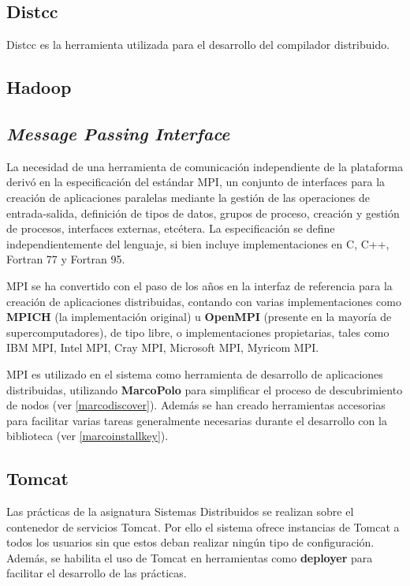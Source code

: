 \subsection{Distcc}

Distcc es la herramienta utilizada para el desarrollo del compilador distribuido. %

\subsection{Hadoop}

\subsection{\textit{Message Passing Interface}}

La necesidad de una herramienta de comunicación independiente de la plataforma derivó en la especificación del estándar MPI\cite{MPISpec}, un conjunto de interfaces para la creación de aplicaciones paralelas mediante la gestión de las operaciones de entrada-salida, definición de tipos de datos, grupos de proceso, creación y gestión de procesos, interfaces externas, etcétera. La especificación se define independientemente del lenguaje, si bien incluye implementaciones en C, C++, Fortran 77 y Fortran 95.

MPI se ha convertido con el paso de los años en la interfaz de referencia para la creación de aplicaciones distribuidas, contando con varias implementaciones como \textbf{MPICH} (la implementación original) u \textbf{OpenMPI} (presente en la mayoría de supercomputadores), de tipo libre, o implementaciones propietarias, tales como IBM MPI, Intel MPI, Cray MPI, Microsoft MPI, Myricom MPI.

MPI es utilizado en el sistema como herramienta de desarrollo de aplicaciones distribuidas, utilizando \textbf{MarcoPolo} para simplificar el proceso de descubrimiento de nodos (ver \ref{marcodiscover}). Además se han creado herramientas accesorias para facilitar varias tareas generalmente necesarias durante el desarrollo con la biblioteca (ver \ref{marcoinstallkey}).

\subsection{Tomcat}

Las prácticas de la asignatura Sistemas Distribuidos se realizan sobre el contenedor de servicios Tomcat. Por ello el sistema ofrece instancias de Tomcat a todos los usuarios sin que estos deban realizar ningún tipo de configuración. Además, se habilita el uso de Tomcat en herramientas como \textbf{deployer} para facilitar el desarrollo de las prácticas.


